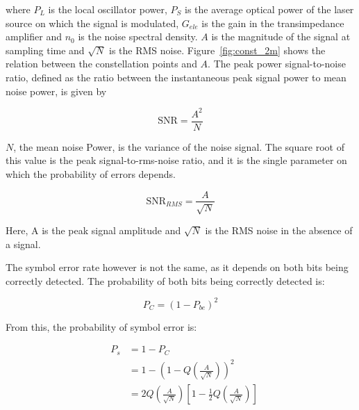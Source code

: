 \noindent where $P_L$ is the local oscillator power, $P_S$ is the average optical power of the laser source on which the signal is modulated, $G_{ele}$ is the gain in the transimpedance amplifier and $n_0$ is the noise spectral density. $A$ is the magnitude of the signal at sampling time and $\sqrt{N}$ is the RMS noise. Figure~\ref{fig:const_2m} shows the relation between the constellation points and $A$.
The peak power signal-to-noise ratio, defined as the ratio between the instantaneous peak signal power to mean noise power, is given by

\begin{equation}
	\text{SNR} = \frac{A^2}{{N}}
\end{equation}

$N$, the mean noise Power, is the variance of the noise signal. The square root of this value is the peak signal-to-rms-noise ratio, and it is the single parameter on which the probability of errors depends.

\begin{equation}
\text{SNR}_{RMS} = \frac{A}{\sqrt{N}}
\end{equation}

Here, A is the peak signal amplitude and $\sqrt{N}$ is the RMS noise in the absence of a signal.

The symbol error rate however is not the same, as it depends on both bits being correctly detected. The probability of both bits being correctly detected is:

\begin{equation}
P_C = (1 - P_{be})^2
\end{equation}

From this, the probability of symbol error is:

\begin{eqnarray}
&P_s &= 1-P_C \nonumber\\
&	   &= 1 - \left(1 - Q \left({\frac{A}{\sqrt{N}}}\right)\right)^2 \nonumber \\
&	   &= 2 Q\left({\frac{A}{\sqrt{N}}}\right)\left[1-\frac{1}{2} Q \left({\frac{A}{\sqrt{N}}}\right)\right]
\end{eqnarray}




